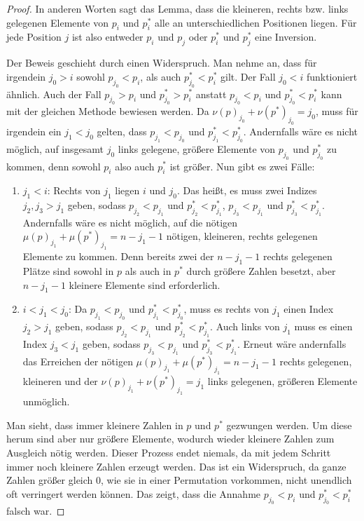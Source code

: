 \documentclass[a4paper, 10pt, ngerman]{article}
\begin{document}
\begin{proof}
    In anderen Worten sagt das Lemma, dass die kleineren, rechts bzw. links gelegenen Elemente von $p_i$ und $p^*_i$ alle an unterschiedlichen Positionen liegen. Für jede Position $j$ ist also entweder $p_i$ und $p_j$ oder $p^*_i$ und $p^*_j$ eine Inversion. 
    
    Der Beweis geschieht durch einen Widerspruch. Man nehme an, dass für irgendein $j_0 > i$ sowohl $p_{j_0} < p_i$, als auch $p^*_{j_0} < p^*_i$ gilt. Der Fall $j_0 < i$ funktioniert ähnlich. Auch der Fall $p_{j_0} > p_i$ und $p^*_{j_0} > p^*_i$ anstatt $p_{j_0} < p_i$ und $p^*_{j_0} < p^*_i$ kann mit der gleichen Methode bewiesen werden. Da $\nu(p)_{j_0} + \nu(p^*)_{j_0} = j_0$, muss für irgendein ein $j_1 < j_0$ gelten, dass $p_{j_1} < p_{j_0}$ und $p^*_{j_1} < p^*_{j_0}$. Andernfalls wäre es nicht möglich, auf insgesamt $j_0$ links gelegene, größere Elemente von $p_{j_0}$ und $p^*_{j_0}$ zu kommen, denn sowohl $p_i$ also auch $p^*_i$ ist größer. Nun gibt es zwei Fälle:
    \begin{enumerate}
        \item $j_1 < i$: Rechts von $j_1$ liegen $i$ und $j_0$. Das heißt, es muss zwei Indizes $j_2, j_3 > j_1$ geben, sodass $p_{j_2} < p_{j_1}$ und $p^*_{j_2} < p^*_{j_1}$, $p_{j_3} < p_{j_1}$ und $p^*_{j_3} < p^*_{j_1}$. Andernfalls wäre es nicht möglich, auf die nötigen $\mu(p)_{j_1} + \mu(p^*)_{j_1} = n - j_1 - 1$ nötigen, kleineren, rechts gelegenen Elemente zu kommen. Denn bereits zwei der $n - j_1 - 1$ rechts gelegenen Plätze sind sowohl in $p$ als auch in $p^*$ durch größere Zahlen besetzt, aber $n - j_1 - 1$ kleinere Elemente sind erforderlich.
        \item $i < j_1 < j_0$: Da $p_{j_1} < p_{j_0}$ und $p^*_{j_1} < p^*_{j_0}$, muss es rechts von $j_1$ einen Index $j_2 > j_1$ geben, sodass $p_{j_2} < p_{j_1}$ und $p^*_{j_2} < p^*_{j_1}$. Auch links von $j_1$ muss es einen Index $j_3 < j_1$ geben, sodass $p_{j_3} < p_{j_1}$ und $p^*_{j_3} < p^*_{j_1}$. Erneut wäre andernfalls das Erreichen der nötigen $\mu(p)_{j_1} + \mu(p^*)_{j_1} = n - j_1 - 1$ rechts gelegenen, kleineren und der $\nu(p)_{j_1} + \nu(p^*)_{j_1} = j_1$ links gelegenen, größeren Elemente unmöglich.
    \end{enumerate}
    Man sieht, dass immer kleinere Zahlen in $p$ und $p^*$ gezwungen werden. Um diese herum sind aber nur größere Elemente, wodurch wieder kleinere Zahlen zum Ausgleich nötig werden. Dieser Prozess endet niemals, da mit jedem Schritt immer noch kleinere Zahlen erzeugt werden. Das ist ein Widerspruch, da ganze Zahlen größer gleich 0, wie sie in einer Permutation vorkommen, nicht unendlich oft verringert werden können. Das zeigt, dass die Annahme $p_{j_0} < p_i$ und $p^*_{j_0} < p^*_i$ falsch war.
\end{proof}
\end{document}
